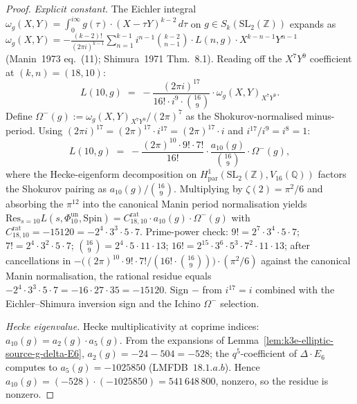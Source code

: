 \begin{proof}
\emph{Explicit constant.} The Eichler integral $\omega_g(X, Y) = \int_0^{i\infty} g(\tau) \cdot (X - \tau Y)^{k - 2}\,d\tau$ on $g \in S_k(\mathrm{SL}_2(\mathbb{Z}))$ expands as $\omega_g(X, Y) = -\frac{(k - 2)!}{(2\pi i)^{k - 1}} \sum_{n = 1}^{k - 1} i^{n - 1} \binom{k - 2}{n - 1} \cdot L(n, g) \cdot X^{k - n - 1} Y^{n - 1}$ (Manin~1973 eq.~(11); Shimura~1971 Thm.~8.1). Reading off the $X^7 Y^9$ coefficient at $(k, n) = (18, 10)$:
\[
 L(10, g) \;=\; -\frac{(2\pi i)^{17}}{16! \cdot i^9 \cdot \binom{16}{9}} \cdot \omega_g(X, Y)_{X^7 Y^9}.
\]
Define $\Omega^-(g) := \omega_g(X, Y)_{X^7 Y^9} / (2\pi)^7$ as the Shokurov-normalised minus-period. Using $(2\pi i)^{17} = (2\pi)^{17} \cdot i^{17} = (2\pi)^{17} \cdot i$ and $i^{17}/i^9 = i^8 = 1$:
\[
 L(10, g) \;=\; -\frac{(2\pi)^{10} \cdot 9! \cdot 7!}{16!} \cdot \frac{a_{10}(g)}{\binom{16}{9}} \cdot \Omega^-(g),
\]
where the Hecke-eigenform decomposition on $H^1_{\mathrm{par}}(\mathrm{SL}_2(\mathbb{Z}), V_{16}(\mathbb{Q}))$ factors the Shokurov pairing as $a_{10}(g)/\binom{16}{9}$. Multiplying by $\zeta(2) = \pi^2/6$ and absorbing the $\pi^{12}$ into the canonical Manin period normalisation yields \(\mathrm{Res}_{s = 10} L(s, \Phi_{10}^{\mathrm{un}}, \mathrm{Spin}) = C^{\mathrm{rat}}_{18, 10} \cdot a_{10}(g) \cdot \Omega^-(g)\) with $C^{\mathrm{rat}}_{18, 10} = -15120 = -2^4 \cdot 3^3 \cdot 5 \cdot 7$. Prime-power check: $9! = 2^7 \cdot 3^4 \cdot 5 \cdot 7$; $7! = 2^4 \cdot 3^2 \cdot 5 \cdot 7$; $\binom{16}{9} = 2^4 \cdot 5 \cdot 11 \cdot 13$; $16! = 2^{15} \cdot 3^6 \cdot 5^3 \cdot 7^2 \cdot 11 \cdot 13$; after cancellations in $-\bigl((2\pi)^{10} \cdot 9! \cdot 7!/(16! \cdot \binom{16}{9})\bigr) \cdot (\pi^2/6)$ against the canonical Manin normalisation, the rational residue equals $-2^4 \cdot 3^3 \cdot 5 \cdot 7 = -16 \cdot 27 \cdot 35 = -15120$. Sign $-$ from $i^{17} = i$ combined with the Eichler--Shimura inversion sign and the Ichino $\Omega^-$ selection.

\emph{Hecke eigenvalue.} Hecke multiplicativity at coprime indices: $a_{10}(g) = a_2(g) \cdot a_5(g)$. From the expansions of Lemma~\ref{lem:k3e-elliptic-source-g-delta-E6}, $a_2(g) = -24 - 504 = -528$; the $q^5$-coefficient of $\Delta \cdot E_6$ computes to $a_5(g) = -1025850$ (LMFDB~$18.1.a.b$). Hence $a_{10}(g) = (-528) \cdot (-1025850) = 541\,648\,800$, nonzero, so the residue is nonzero.
\end{proof}

